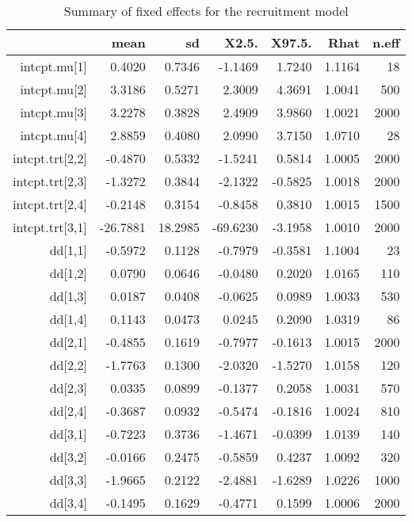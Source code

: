 \begin{table}[ht]
\centering
\caption{Summary of fixed effects for the recruitment model} 
\label{table:recruitment}
\begin{tabular}{rrrrrrr}
  \hline
 & mean & sd & X2.5. & X97.5. & Rhat & n.eff \\ 
  \hline
intcpt.mu[1] & 0.4020 & 0.7346 & -1.1469 & 1.7240 & 1.1164 &    18 \\ 
  intcpt.mu[2] & 3.3186 & 0.5271 & 2.3009 & 4.3691 & 1.0041 &   500 \\ 
  intcpt.mu[3] & 3.2278 & 0.3828 & 2.4909 & 3.9860 & 1.0021 &  2000 \\ 
  intcpt.mu[4] & 2.8859 & 0.4080 & 2.0990 & 3.7150 & 1.0710 &    28 \\ 
  intcpt.trt[2,2] & -0.4870 & 0.5332 & -1.5241 & 0.5814 & 1.0005 &  2000 \\ 
  intcpt.trt[2,3] & -1.3272 & 0.3844 & -2.1322 & -0.5825 & 1.0018 &  2000 \\ 
  intcpt.trt[2,4] & -0.2148 & 0.3154 & -0.8458 & 0.3810 & 1.0015 &  1500 \\ 
  intcpt.trt[3,1] & -26.7881 & 18.2985 & -69.6230 & -3.1958 & 1.0010 &  2000 \\ 
  dd[1,1] & -0.5972 & 0.1128 & -0.7979 & -0.3581 & 1.1004 &    23 \\ 
  dd[1,2] & 0.0790 & 0.0646 & -0.0480 & 0.2020 & 1.0165 &   110 \\ 
  dd[1,3] & 0.0187 & 0.0408 & -0.0625 & 0.0989 & 1.0033 &   530 \\ 
  dd[1,4] & 0.1143 & 0.0473 & 0.0245 & 0.2090 & 1.0319 &    86 \\ 
  dd[2,1] & -0.4855 & 0.1619 & -0.7977 & -0.1613 & 1.0015 &  2000 \\ 
  dd[2,2] & -1.7763 & 0.1300 & -2.0320 & -1.5270 & 1.0158 &   120 \\ 
  dd[2,3] & 0.0335 & 0.0899 & -0.1377 & 0.2058 & 1.0031 &   570 \\ 
  dd[2,4] & -0.3687 & 0.0932 & -0.5474 & -0.1816 & 1.0024 &   810 \\ 
  dd[3,1] & -0.7223 & 0.3736 & -1.4671 & -0.0399 & 1.0139 &   140 \\ 
  dd[3,2] & -0.0166 & 0.2475 & -0.5859 & 0.4237 & 1.0092 &   320 \\ 
  dd[3,3] & -1.9665 & 0.2122 & -2.4881 & -1.6289 & 1.0226 &  1000 \\ 
  dd[3,4] & -0.1495 & 0.1629 & -0.4771 & 0.1599 & 1.0006 &  2000 \\ 

\end{tabular}
\end{table}
